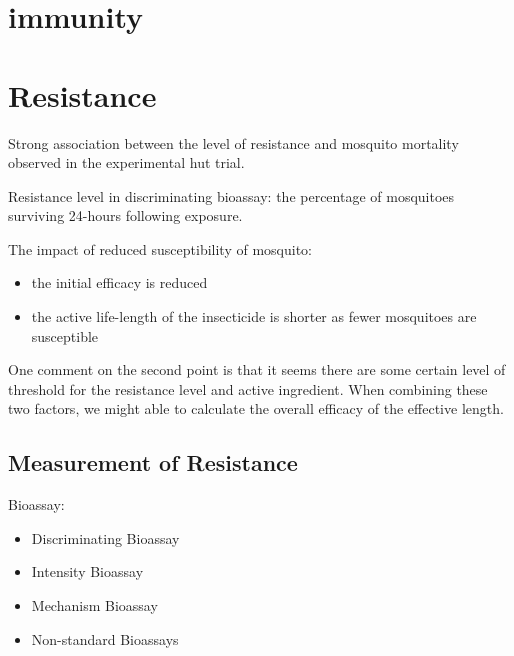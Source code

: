 \documentclass[a4paper, 12pt, twoside]{article}
\begin{document}
\section{immunity}

\section{Resistance}

Strong association between the level of resistance and mosquito mortality observed in the experimental hut trial\cite{Sherrard-Smith2018b}.



Resistance level in discriminating bioassay: the percentage of mosquitoes surviving 24-hours following exposure.

The impact of reduced susceptibility of mosquito:
\begin{itemize}
  \item the initial efficacy is reduced
  \item the active life-length of the insecticide is shorter as fewer mosquitoes are susceptible
\end{itemize}


One comment on the second point is that it seems there are some certain level of threshold for the resistance level and active ingredient. When combining these two factors, we might able to calculate the overall efficacy of the effective length. 

\subsection{Measurement of Resistance}

Bioassay:

\begin{itemize}
  \item Discriminating Bioassay
  \item Intensity Bioassay
  \item Mechanism Bioassay
  \item Non-standard Bioassays
\end{itemize}
\end{document}
